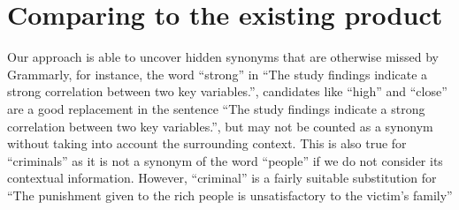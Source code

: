 \documentclass[12pt,oneside,openright,a4paper]{cpe-english-project}
\begin{document}
\section{Comparing to the existing product}
Our approach is able to uncover hidden synonyms that are otherwise missed by Grammarly, for instance, the word “strong” in “The study findings indicate a strong correlation between two key variables.”, candidates like “high” and “close” are a good replacement in the sentence “The study findings indicate a strong correlation between two key variables.”, but may not be counted as a synonym without taking into account the surrounding context. This is also true for “criminals” as it is not a synonym of the word “people” if we do not consider its contextual information. However, “criminal” is a fairly suitable substitution for “The punishment given to the rich people is unsatisfactory to the victim's family”
\\\\
\end{document}
